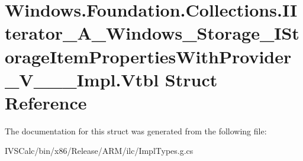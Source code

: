 \hypertarget{struct_windows_1_1_foundation_1_1_collections_1_1_i_iterator___a___windows___storage___i_storagecff2e86dfd1abaf329809f534e153966}{}\section{Windows.\+Foundation.\+Collections.\+I\+Iterator\+\_\+\+A\+\_\+\+Windows\+\_\+\+Storage\+\_\+\+I\+Storage\+Item\+Properties\+With\+Provider\+\_\+\+V\+\_\+\+\_\+\+\_\+\+Impl.\+Vtbl Struct Reference}
\label{struct_windows_1_1_foundation_1_1_collections_1_1_i_iterator___a___windows___storage___i_storagecff2e86dfd1abaf329809f534e153966}


The documentation for this struct was generated from the following file\+:\begin{DoxyCompactItemize}
\item 
I\+V\+S\+Calc/bin/x86/\+Release/\+A\+R\+M/ilc/Impl\+Types.\+g.\+cs\end{DoxyCompactItemize}

